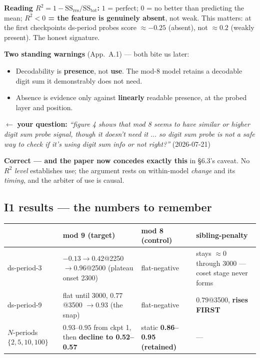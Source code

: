 \documentclass[11pt]{article}
\newcommand{\yourq}[2]{%
  \par\vspace{4pt}\noindent
  \textcolor{qcol}{$\leftarrow$ \textbf{your question:}
  \textit{``#1''}\; \textnormal{(#2)}}\par\vspace{4pt}}
\begin{document}
\textbf{Reading $R^2 = 1 - \mathrm{SS_{res}}/\mathrm{SS_{tot}}$:}
$1$ = perfect; $0$ = no better than predicting the mean;
\textbf{$R^2 < 0$ = the feature is genuinely absent}, not weak. This matters: at
the first checkpoints ds-period probes score $\approx -0.25$ (absent), not
$\approx 0.2$ (weakly present). The honest signature.

\textbf{Two standing warnings} (App.~A.1) --- both bite us later:
\begin{itemize}[leftmargin=*,itemsep=1pt]
\item Decodability is \textbf{presence}, not \textbf{use}. The mod-8 model retains
a decodable digit sum it demonstrably does not need.
\item Absence is evidence only against \textbf{linearly} readable presence, at the
probed layer and position.
\end{itemize}

\yourq{figure 4 shows that mod 8 seems to have similar or higher digit sum probe
signal, though it doesn't need it $\ldots$ so digit sum probe is not a safe way to
check if it's using digit sum info or not right?}{2026-07-21}

\noindent\textbf{Correct --- and the paper now concedes exactly this} in \S6.3's
caveat. No $R^2$ \emph{level} establishes use; the argument rests on within-model
\emph{change} and its \emph{timing}, and the arbiter of use is causal.

\subsection*{I1 results --- the numbers to remember}

\begin{center}
\small
\begin{tabular}{@{}lp{4.3cm}p{3.1cm}p{3.9cm}@{}}
\toprule
& \textbf{mod 9 (target)} & \textbf{mod 8 (control)} & \textbf{sibling-penalty} \\
\midrule
ds-period-3 & $-0.13 \to \mathbf{0.42}$@2250 $\to \mathbf{0.96}$@2500
  (plateau onset 2300) & flat-negative & stays $\approx 0$ through 3000 --- coset stage never forms \\
\addlinespace
ds-period-9 & flat until 3000, $\mathbf{0.77}$@3500 $\to 0.93$ (the snap)
  & flat-negative & $\mathbf{0.79}$@3500, \textbf{rises FIRST} \\
\addlinespace
$N$-periods $\{2,5,10,100\}$ & $\mathbf{0.93\text{--}0.95}$ from ckpt 1, then
  \textbf{decline to 0.52--0.57} & static \textbf{0.86--0.95 (retained)} & --- \\
\bottomrule
\end{tabular}
\end{center}
\end{document}
